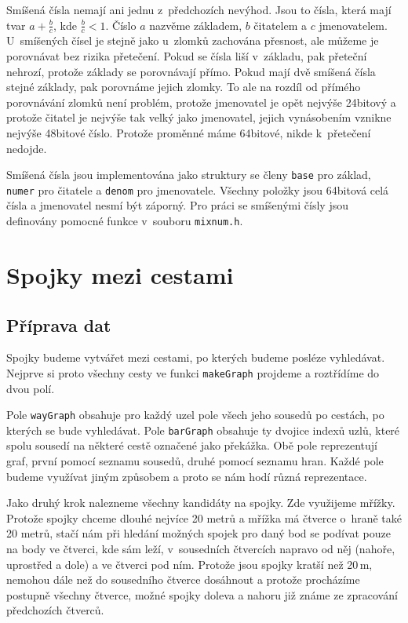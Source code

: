 {\tuc Smíšená čísla} nemají ani jednu z~předchozích nevýhod. Jsou to čísla,
která mají tvar $a+\frac{b}{c}$, kde $\frac{b}{c}<1$. Číslo $a$ nazvěme
základem, $b$ čitatelem a $c$ jmenovatelem. U~smíšených čísel je stejně jako
u~zlomků zachována přesnost, ale můžeme je porovnávat bez rizika přetečení.
Pokud se čísla liší v~základu, pak přeteční nehrozí, protože základy se
porovnávají přímo. Pokud mají dvě smíšená čísla stejné základy, pak porovnáme
jejich zlomky. To ale na rozdíl od přímého porovnávání zlomků není problém,
protože jmenovatel je opět nejvýše 24bitový a protože čitatel je nejvýše tak
velký jako jmenovatel, jejich vynásobením vznikne nejvýše 48bitové číslo.
Protože proměnné máme 64bitové, nikde k~přetečení nedojde.

Smíšená čísla jsou implementována jako struktury se členy \verb|base| pro
základ, \verb|numer| pro čitatele a \verb|denom| pro jmenovatele. Všechny
položky jsou 64bitová celá čísla a jmenovatel nesmí být záporný. Pro práci se
smíšenými čísly jsou definovány pomocné funkce v~souboru \verb|mixnum.h|.

\section{Spojky mezi cestami}
\subsection{Příprava dat}
Spojky budeme vytvářet mezi cestami, po kterých budeme posléze vyhledávat.
Nejprve si proto všechny cesty ve funkci \verb|makeGraph| projdeme a roztřídíme
do dvou polí. 

Pole \verb|wayGraph| obsahuje pro každý uzel pole všech jeho sousedů po cestách,
po kterých se bude vyhledávat. Pole \verb|barGraph| obsahuje ty dvojice indexů
uzlů, které spolu sousedí na některé cestě označené jako překážka. Obě pole
reprezentují graf, první pomocí seznamu sousedů, druhé pomocí seznamu hran.
Každé pole budeme využívat jiným způsobem a proto se nám hodí různá
reprezentace.

Jako druhý krok nalezneme všechny kandidáty na spojky. Zde využijeme mřížky.
Protože spojky chceme dlouhé nejvíce 20 metrů a mřížka má čtverce o~hraně také
20 metrů, stačí nám při hledání možných spojek pro daný bod se podívat pouze na
body ve čtverci, kde sám leží, v~sousedních čtvercích napravo od něj (nahoře,
uprostřed a dole) a ve čtverci pod ním. Protože jsou spojky kratší než 20\,m,
nemohou dále než do sousedního čtverce dosáhnout a protože procházíme postupně
všechny čtverce, možné spojky doleva a nahoru již známe ze zpracování
předchozích čtverců. 

